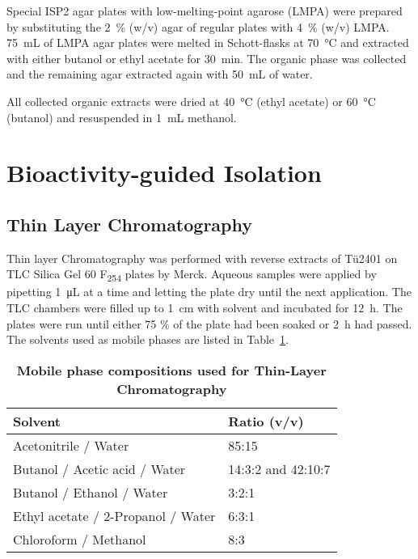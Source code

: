 	Special ISP2 agar plates with low-melting-point agarose (LMPA) were prepared by substituting the 2~\% (w/v) agar of regular plates with 4~\% (w/v) LMPA. \SI{75}{\milli\liter} of LMPA agar plates were melted in Schott-flasks at \SI{70}{\celsius} and extracted with either butanol or ethyl acetate for \SI{30}{\minute}. The organic phase was collected and the remaining agar extracted again with \SI{50}{\milli\liter} of water.

	All collected organic extracts were dried at \SI{40}{\celsius} (ethyl acetate) or \SI{60}{\celsius} (butanol) and resuspended in \SI{1}{\milli\liter} methanol.


\clearpage

\section{Bioactivity-guided Isolation} %
\label{sec:bioactivity_guided_isolation}

	\subsection{Thin Layer Chromatography} %
	\label{sub:thin_layer_chromatography}
	Thin layer Chromatography was performed with reverse extracts of T\"u2401 on TLC Silica Gel 60 F\textsubscript{254} plates by Merck.
	Aqueous samples were applied by pipetting \SI{1}{\micro\liter} at a time and letting the plate dry until the next application. The TLC chambers were filled up to \SI{1}{\centi\meter} with solvent and incubated for \SI{12}{\hour}. The plates were run until either 75 \% of the plate had been soaked or \SI{2}{\hour} had passed. The solvents used as mobile phases are listed in Table~\ref{tab:tlc_solvents}.

	\begin{table}[htbp]
		\caption[Mobile phase compositions used for Thin-Layer Chromatography]{\textbf{Mobile phase compositions used for Thin-Layer Chromatography}}
		\label{tab:tlc_solvents}
		\centering
		\begin{tabularx}{\textwidth}{XX}
			\toprule
			\textbf{Solvent}			& \textbf{Ratio (v/v)}	\\
			\midrule
			Acetonitrile / Water				& 85:15		\\
			Butanol / Acetic acid / Water		& 14:3:2 and 42:10:7	\\
			Butanol / Ethanol / Water			& 3:2:1		\\
			Ethyl acetate / 2-Propanol / Water	& 6:3:1		\\
			Chloroform / Methanol				& 8:3		\\
			\bottomrule
		\end{tabularx}
	\end{table}

